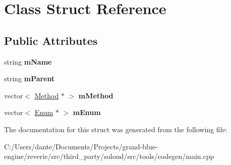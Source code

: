\hypertarget{struct_class}{}\section{Class Struct Reference}
\label{struct_class}
\subsection*{Public Attributes}
\begin{DoxyCompactItemize}
\item 
\mbox{\label{struct_class_a020ab45c30c6709cafebd66ffda60ec9}} 
string {\bfseries m\+Name}
\item 
\mbox{\label{struct_class_a75e7592e40841f6ad2ab5e50354a0853}} 
string {\bfseries m\+Parent}
\item 
\mbox{\label{struct_class_a52efca4cdab07ef09575a0401424f612}} 
vector$<$ \mbox{\hyperlink{struct_method}{Method}} $\ast$ $>$ {\bfseries m\+Method}
\item 
\mbox{\label{struct_class_a1da2a5a3fa4e211892993ae321d8c777}} 
vector$<$ \mbox{\hyperlink{struct_enum}{Enum}} $\ast$ $>$ {\bfseries m\+Enum}
\end{DoxyCompactItemize}


The documentation for this struct was generated from the following file\+:\begin{DoxyCompactItemize}
\item 
C\+:/\+Users/dante/\+Documents/\+Projects/grand-\/blue-\/engine/reverie/src/third\+\_\+party/soloud/src/tools/codegen/main.\+cpp\end{DoxyCompactItemize}
